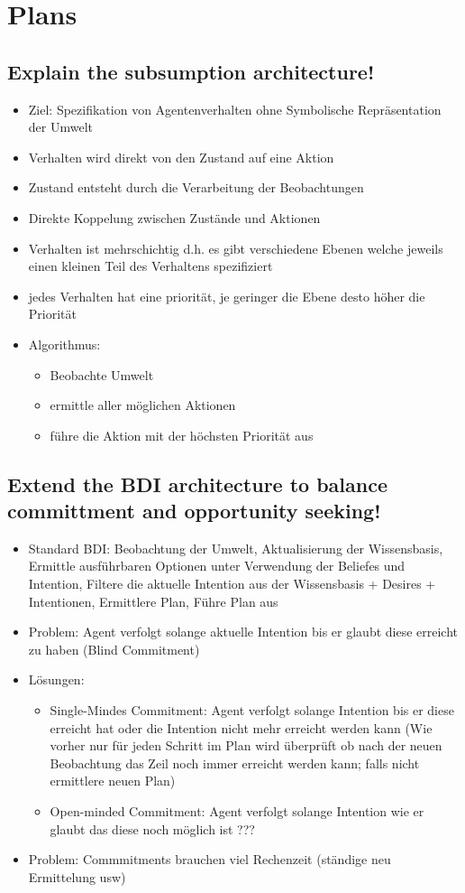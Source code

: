 \section{Plans}
\subsection{Explain the subsumption architecture!}
\begin{itemize}
	\item Ziel: Spezifikation von Agentenverhalten ohne Symbolische Repräsentation der Umwelt
	\item Verhalten wird direkt von den Zustand auf eine Aktion
	\item Zustand entsteht durch die Verarbeitung der Beobachtungen
	\item Direkte Koppelung zwischen Zustände und Aktionen
	\item Verhalten ist mehrschichtig d.h. es gibt verschiedene Ebenen welche jeweils einen kleinen Teil des Verhaltens spezifiziert
	\item jedes Verhalten hat eine priorität, je geringer die Ebene desto höher die Priorität
	\item Algorithmus:
	\begin{itemize}
		\item Beobachte Umwelt
		\item ermittle aller möglichen Aktionen
		\item führe die Aktion mit der höchsten Priorität aus
	\end{itemize}
\end{itemize}
\subsection{Extend the BDI architecture to balance committment and opportunity seeking!}
\begin{itemize}
	\item Standard BDI: Beobachtung der Umwelt, Aktualisierung der Wissensbasis, Ermittle ausführbaren Optionen unter Verwendung der Beliefes und Intention, Filtere die aktuelle Intention aus der Wissensbasis + Desires + Intentionen, Ermittlere Plan, Führe Plan aus
	\item Problem: Agent verfolgt solange aktuelle Intention bis er glaubt diese erreicht zu haben (Blind Commitment)
	\item Lösungen:
	\begin{itemize}
		\item Single-Mindes Commitment: Agent verfolgt solange Intention bis er diese erreicht hat oder die Intention nicht mehr erreicht werden kann (Wie vorher nur für jeden Schritt im Plan wird überprüft ob nach der neuen Beobachtung das Zeil noch immer erreicht werden kann; falls nicht ermittlere neuen Plan)
		\item Open-minded Commitment: Agent verfolgt solange Intention wie er glaubt das diese noch möglich ist ???
	\end{itemize}
	\item Problem: Commmitments brauchen viel Rechenzeit (ständige neu Ermittelung usw)
\end{itemize}
